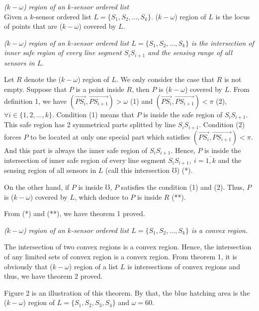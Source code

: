 \begin{df}
{\itshape($k-\omega$) region of an $k$-sensor ordered list}\\
Given a $k$-sensor ordered list $L = \{S_1,S_2,...,S_k\}$. ($k-\omega$) region of $L$ is the locus of points that are ($k-\omega$) covered by $L$.
\end{df}
\begin{thr}
{\itshape($k-\omega$) region of an $k$-sensor ordered list $L =\{S_1,S_2,...,S_k\}$ is the intersection of inner safe region of every line segment $S_iS_{i+1}$ and the sensing range of all sensors in $L$}.
\end{thr}
\begin{pf}
	Let $R$ denote the ($k-\omega$) region of $L$. We only consider the case that $R$ is not empty. Suppose that $P$ is a point inside $R$, then $P$ is ($k-\omega$) covered by $L$. From definition 1, we have $(\overrightarrow{PS_i}, \overrightarrow{PS_{i+1}}) > \omega$ (1) and $(\overrightarrow{PS_i}, \overrightarrow{PS_{i+1}}) < \pi$ (2),\ $\forall i \in \{1,2,...,k\}$. Condition (1) means that $P$ is inside the safe region of $S_iS_{i+1}$. This safe region has 2 symmetrical parts splitted by line $S_iS_{i+1}$. Condition (2) forces $P$ to be located at only one special part which satisfies $(\overrightarrow{PS_i}, \overrightarrow{PS_{i+1}}) < \pi$. And this part is always the inner safe region of $S_iS_{i+1}$. Hence, $P$ is inside the intersection of inner safe region of every line segment $S_iS_{i+1},\ i=\overline{1,k}$ and the sensing region of all sensors in $L$ (call this intersection $\mho$) (*).\par
\indent On the other hand, if $P$ is inside $\mho$, $P$ satisfies the condition (1) and (2). Thus, $P$ is ($k-\omega$) covered by $L$, which deduce to $P$ is inside $R$ (**).\par
\indent From (*) and (**), we have theorem 1 proved.
\end{pf}
\begin{thr}
{\itshape($k-\omega$) region of an $k$-sensor ordered list $L =\{S_1,S_2,...,S_k\}$ is a convex region}.
\end{thr}
\begin{pf}
The intersection of two convex regions is a convex region. Hence, the intersection of any limited sets of convex region is a convex region. From theorem 1, it is obviously that ($k-\omega$) region of a list $L$ is intersections of convex regions and thus, we have theorem 2 proved.
\end{pf}
Figure 2 is an illustration of this theorem. By that, the blue hatching area is the ($k-\omega$) region of $L=\{S_1,S_2,S_3,S_4\}$ and $\omega = 60$.
